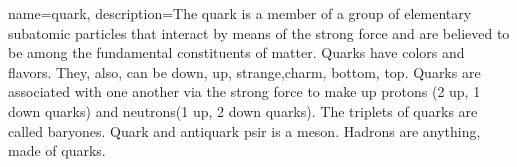 {
    name=quark,
    description={The quark is a member of a group of elementary subatomic particles that interact by means of the strong force and are believed to be among the fundamental constituents of matter. Quarks have colors and flavors. They, also, can be down, up, strange,charm, bottom, top. Quarks are associated with one another via the strong force to make up protons (2 up, 1 down quarks) and neutrons(1 up, 2 down quarks). The triplets of quarks are called baryones. Quark and antiquark psir is a meson. Hadrons are anything, made of quarks.}
}
